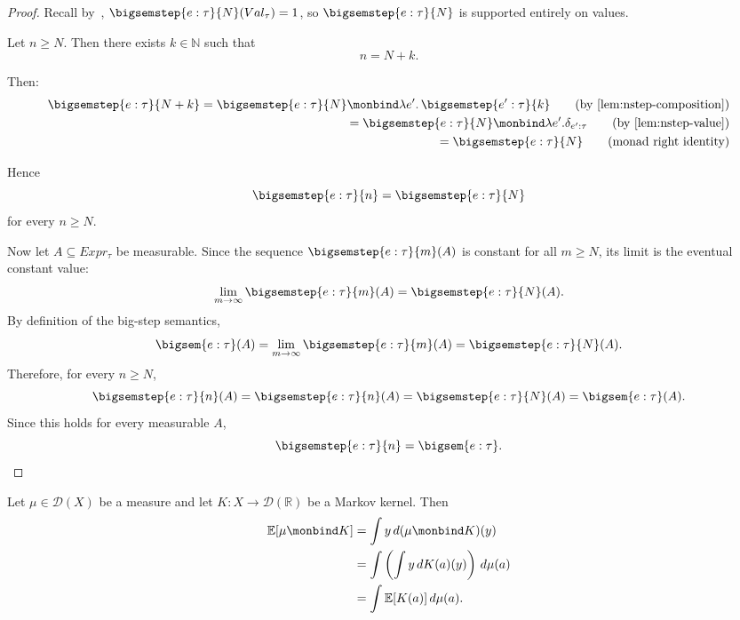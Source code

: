 \begin{proof}
  Recall by~, $\bigsemstep{e : \tau}{N}(Val_\tau) = 1$, so $\bigsemstep{e : \tau}{N}$ is supported entirely on values.

  Let $n \geq N$. Then there exists $k \in \mathbb{N}$ such that
  \[
    n = N+k.
  \]

  Then:
  \begin{align*}
    \bigsemstep{e : \tau}{N+k}
    =
    \bigsemstep{e : \tau}{N}
    \monbind
    \lambda e'.\,\bigsemstep{e' : \tau}{k} \tag{by~\Cref{lem:nstep-composition}}\\
    = \bigsemstep{e : \tau}{N}
    \monbind \lambda e'. \delta_{e' : \tau} \tag{by~\Cref{lem:nstep-value}}\\
    = \bigsemstep{e : \tau}{N} \tag{monad right identity}\\
  \end{align*}

  Hence
  \[
    \bigsemstep{e : \tau}{n} = \bigsemstep{e : \tau}{N}
  \]
  for every $n \geq N$.

  Now let $A \subseteq Expr_\tau$ be measurable. Since the sequence
  $\bigsemstep{e : \tau}{m}(A)$ is constant for all $m \geq N$, its limit is the eventual
  constant value:
  \[
    \lim_{m \to \infty} \bigsemstep{e : \tau}{m}(A)
    =
    \bigsemstep{e : \tau}{N}(A).
  \]
  By definition of the big-step semantics,
  \[
    \bigsem{e : \tau}(A)
    =
    \lim_{m \to \infty} \bigsemstep{e : \tau}{m}(A)
    =
    \bigsemstep{e : \tau}{N}(A).
  \]
  Therefore, for every $n \geq N$,
  \[
    \bigsemstep{e : \tau}{n}(A)
    =
    \bigsemstep{e : \tau}{n}(A)
    =
    \bigsemstep{e : \tau}{N}(A)
    =
    \bigsem{e : \tau}(A).
  \]
  Since this holds for every measurable $A$, 
  \[
    \bigsemstep{e : \tau}{n}
    =
    \bigsem{e : \tau}.
  \]
\end{proof}

\begin{lemma}\label{lem:expectation-bind}
  Let $\mu \in \mathcal{D}(X)$ be a measure and let
  $K : X \to \mathcal{D}(\mathbb{R})$ be a Markov kernel. Then
  \[
  \begin{aligned}
    \mathbb{E}[\mu \monbind K]
    &=
    \int y \, d(\mu \monbind K)(y) \\
    &=
    \int
      \left(
        \int y \, dK(a)(y)
      \right)
    \,d\mu(a) \\
    &=
    \int \mathbb{E}[K(a)] \, d\mu(a).
  \end{aligned}
  \]
\end{lemma}

